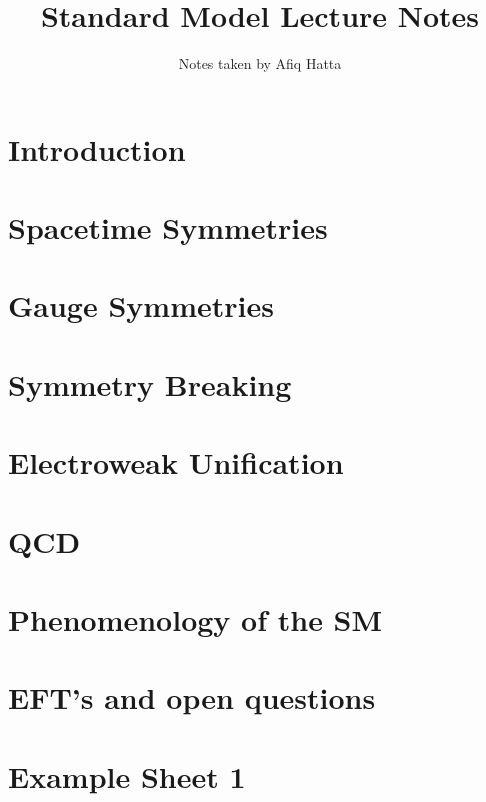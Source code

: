 \documentclass[11pt, oneside]{article}   	%
\title{Standard Model Lecture Notes}
\author{Notes taken by Afiq Hatta}
\theoremstyle{slanted}
\begin{document}
 
\maketitle
\tableofcontents

\pagebreak 

\section{Introduction}%
\label{sec:introduction}

\section{Spacetime Symmetries} 

\section{Gauge Symmetries}%
\label{sec:gauge_symmetries}

\section{Symmetry Breaking}%
\label{sec:symmetry_breaking}

\section{Electroweak Unification}%
\label{sec:electroweak_unification}

\section{QCD}%
\label{sec:qcd}

\section{Phenomenology of the SM}%
\label{sec:phenomenology_of_the_sm}

\section{EFT's and open questions}%
\label{sec:eft_s_and_open_questions}



\section*{Example Sheet 1}
 
\end{document}
